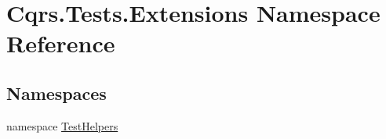 \hypertarget{namespaceCqrs_1_1Tests_1_1Extensions}{}\section{Cqrs.\+Tests.\+Extensions Namespace Reference}
\label{namespaceCqrs_1_1Tests_1_1Extensions}
\subsection*{Namespaces}
\begin{DoxyCompactItemize}
\item 
namespace \hyperlink{namespaceCqrs_1_1Tests_1_1Extensions_1_1TestHelpers}{Test\+Helpers}
\end{DoxyCompactItemize}
